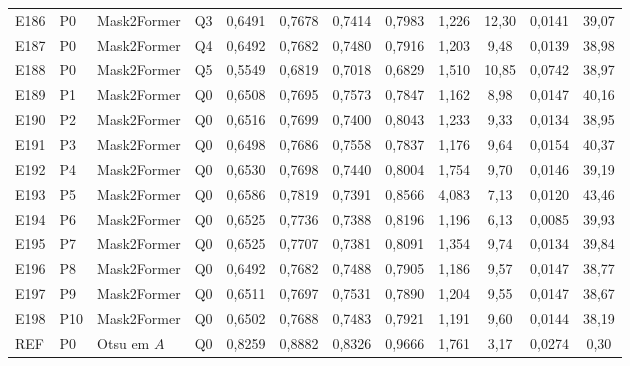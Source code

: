 \begin{longtable}{lllllccccccc}
E186 & P0 & Mask2Former & Q3 & 0{,}6491 & 0{,}7678 & 0{,}7414 & 0{,}7983 & 1{,}226 & 12{,}30 & 0{,}0141 & 39{,}07 \\
E187 & P0 & Mask2Former & Q4 & 0{,}6492 & 0{,}7682 & 0{,}7480 & 0{,}7916 & 1{,}203 & 9{,}48 & 0{,}0139 & 38{,}98 \\
E188 & P0 & Mask2Former & Q5 & 0{,}5549 & 0{,}6819 & 0{,}7018 & 0{,}6829 & 1{,}510 & 10{,}85 & 0{,}0742 & 38{,}97 \\
E189 & P1 & Mask2Former & Q0 & 0{,}6508 & 0{,}7695 & 0{,}7573 & 0{,}7847 & 1{,}162 & 8{,}98 & 0{,}0147 & 40{,}16 \\
E190 & P2 & Mask2Former & Q0 & 0{,}6516 & 0{,}7699 & 0{,}7400 & 0{,}8043 & 1{,}233 & 9{,}33 & 0{,}0134 & 38{,}95 \\
E191 & P3 & Mask2Former & Q0 & 0{,}6498 & 0{,}7686 & 0{,}7558 & 0{,}7837 & 1{,}176 & 9{,}64 & 0{,}0154 & 40{,}37 \\
E192 & P4 & Mask2Former & Q0 & 0{,}6530 & 0{,}7698 & 0{,}7440 & 0{,}8004 & 1{,}754 & 9{,}70 & 0{,}0146 & 39{,}19 \\
E193 & P5 & Mask2Former & Q0 & 0{,}6586 & 0{,}7819 & 0{,}7391 & 0{,}8566 & 4{,}083 & 7{,}13 & 0{,}0120 & 43{,}46 \\
E194 & P6 & Mask2Former & Q0 & 0{,}6525 & 0{,}7736 & 0{,}7388 & 0{,}8196 & 1{,}196 & 6{,}13 & 0{,}0085 & 39{,}93 \\
E195 & P7 & Mask2Former & Q0 & 0{,}6525 & 0{,}7707 & 0{,}7381 & 0{,}8091 & 1{,}354 & 9{,}74 & 0{,}0134 & 39{,}84 \\
E196 & P8 & Mask2Former & Q0 & 0{,}6492 & 0{,}7682 & 0{,}7488 & 0{,}7905 & 1{,}186 & 9{,}57 & 0{,}0147 & 38{,}77 \\
E197 & P9 & Mask2Former & Q0 & 0{,}6511 & 0{,}7697 & 0{,}7531 & 0{,}7890 & 1{,}204 & 9{,}55 & 0{,}0147 & 38{,}67 \\
E198 & P10 & Mask2Former & Q0 & 0{,}6502 & 0{,}7688 & 0{,}7483 & 0{,}7921 & 1{,}191 & 9{,}60 & 0{,}0144 & 38{,}19 \\
REF & P0 & Otsu em $A$ & Q0 & 0{,}8259 & 0{,}8882 & 0{,}8326 & 0{,}9666 & 1{,}761 & 3{,}17 & 0{,}0274 & 0{,}30 \\
\end{longtable}
\endgroup
